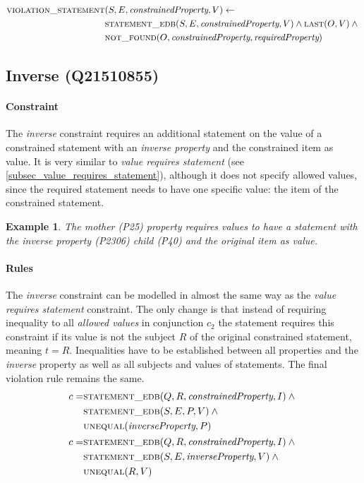 \documentclass[hyperref,bachelorofscience,fleqn]{cgvpub}
\newtheorem{example}{Example}
\begin{document}
\begin{align}
\begin{split}
\textsc{violation\_statement}&(S, E, \emph{constrainedProperty}, V) \leftarrow \\
&\textsc{statement\_edb}(S, E, \emph{constrainedProperty}, V) \wedge{} \textsc{last}(O, V) \wedge{} \\
&\textsc{not\_found}(O, \emph{constrainedProperty}, \emph{requiredProperty})
\end{split}
\end{align}

\subsection{Inverse (Q21510855)}\label{subsec_2_inverse}
\paragraph{Constraint}
The \emph{inverse} constraint requires an additional statement on the value of a constrained statement with an \emph{inverse property} and the constrained item as value. It is very similar to \emph{value requires statement} (see \ref{subsec_value_requires_statement}), although it does not specify allowed values, since the required statement needs to have one specific value: the item of the constrained statement.

\begin{example}
The \emph{mother} (P25) property requires values to have a statement with the \emph{inverse property} (P2306) \emph{child} (P40) and the original item as value.
\end{example}

\paragraph{Rules}
The \emph{inverse} constraint can be modelled in almost the same way as the \emph{value requires statement} constraint. The only change is that instead of requiring inequality to all \emph{allowed values} in conjunction \(c_2\) the statement requires this constraint if its value is not the subject \(R\) of the original constrained statement, meaning \(t = R\). Inequalities have to be established between all properties and the \emph{inverse} property as well as all subjects and values of statements. The final violation rule remains the same.
\begin{align}
\begin{split}
c = &\textsc{statement\_edb}(Q, R, \emph{constrainedProperty}, I) \wedge{} \\
&\textsc{statement\_edb}(S, E, P, V) \wedge{} \\
&\textsc{unequal}(\emph{inverseProperty}, P)
\end{split}\\
\begin{split}
c = &\textsc{statement\_edb}(Q, R, \emph{constrainedProperty}, I) \wedge{} \\
&\textsc{statement\_edb}(S, E, \emph{inverseProperty}, V) \wedge{} \\
&\textsc{unequal}(R, V)
\end{split}
\end{align}
\end{document}
